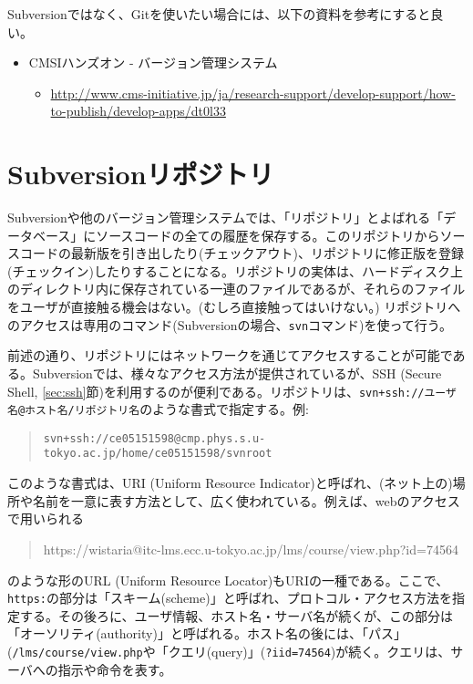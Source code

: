 \documentclass[a4j]{jsbook}
\begin{document}
Subversionではなく、Gitを使いたい場合には、以下の資料を参考にすると良い。
\begin{itemize}
\item {CMSIハンズオン - バージョン管理システム}
  \begin{itemize}
  \item {\footnotesize \url{http://www.cms-initiative.jp/ja/research-support/develop-support/how-to-publish/develop-apps/dt0l33}}
  \end{itemize}
\end{itemize}

\section{Subversionリポジトリ}

Subversionや他のバージョン管理システムでは、「リポジトリ」とよばれる「データベース」にソースコードの全ての履歴を保存する。このリポジトリからソースコードの最新版を引き出したり(チェックアウト)、リポジトリに修正版を登録(チェックイン)したりすることになる。リポジトリの実体は、ハードディスク上のディレクトリ内に保存されている一連のファイルであるが、それらのファイルをユーザが直接触る機会はない。(むしろ直接触ってはいけない。) リポジトリへのアクセスは専用のコマンド(Subversionの場合、{\tt svn}コマンド)を使って行う。

前述の通り、リポジトリにはネットワークを通じてアクセスすることが可能である。Subversionでは、様々なアクセス方法が提供されているが、SSH (Secure Shell, \ref{sec:ssh}節)を利用するのが便利である。リポジトリは、{\tt svn+ssh://ユーザ名@ホスト名/リポジトリ名}のような書式で指定する。例:
\begin{quote}
  {\tt svn+ssh://ce05151598@cmp.phys.s.u-tokyo.ac.jp/home/ce05151598/svnroot}
\end{quote}

このような書式は、URI (Uniform Resource Indicator)と呼ばれ、(ネット上の)場所や名前を一意に表す方法として、広く使われている。例えば、webのアクセスで用いられる
\begin{quote}
  {{https://wistaria@itc-lms.ecc.u-tokyo.ac.jp/lms/course/view.php?id=74564}}
\end{quote}
のような形のURL (Uniform Resource Locator)もURIの一種である。ここで、{\tt https:}の部分は「スキーム(scheme)」と呼ばれ、プロトコル・アクセス方法を指定する。その後ろに、ユーザ情報、ホスト名・サーバ名が続くが、この部分は「オーソリティ(authority)」と呼ばれる。ホスト名の後には、「パス」({\tt /lms/course/view.php}や「クエリ(query)」({\tt ?iid=74564})が続く。クエリは、サーバへの指示や命令を表す。
\end{document}
